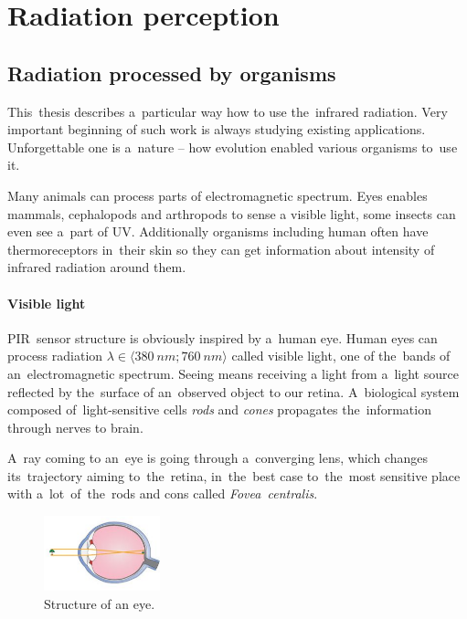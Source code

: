 \newpage
\section{Radiation perception}

\subsection*{Radiation processed by organisms}
This~thesis describes a~particular way how to use the~infrared radiation. Very important beginning of such
work is always studying existing applications. Unforgettable one is a~nature -- how evolution enabled 
various organisms to~use it.

Many animals can process parts of electromagnetic spectrum. Eyes enables mammals, cephalopods and arthropods
to sense a visible light, some insects can even see a~part of UV. Additionally organisms including human often
have thermoreceptors in~their skin so they can get information about intensity of infrared radiation around them.


\paragraph{Visible light}
\label{subsection:eye}
PIR~sensor structure is obviously inspired by a~human eye. Human eyes can process radiation
$\lambda \in \langle 380~nm;760~nm \rangle$ called visible light, one of the~bands of an~electromagnetic spectrum.
Seeing means receiving a light from a~light source reflected by the~surface of an~observed object to our retina.
A~biological system composed of~light-sensitive cells {\it rods} and {\it cones} propagates the~information
through nerves to brain.

A~ray coming to an~eye is going through a~converging lens, which changes its~trajectory aiming to~the~retina,
in~the~best case to~the~most sensitive place with a~lot~of~the~rods and cons called {\it Fovea~centralis}.
\cite{LightEyeVision}

\begin{figure}[h!]
\begin{center}
\includegraphics[width=0.3\textwidth]{obrazky-figures/eye.png}
\caption{Structure of an eye. \cite{Eye}\label{fig:eye}}
\end{center}    
\end{figure}


